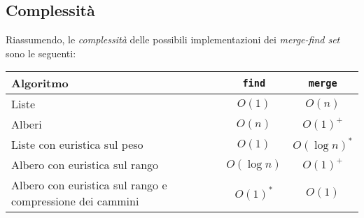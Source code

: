 \subsection{Complessità}
Riassumendo, le \emph{complessità} delle possibili implementazioni dei
\emph{merge-find set} sono le seguenti\footnotemark:

\begin{table}[h!]
    \centering
    \renewcommand{\arraystretch}{1.2}
    \begin{tabular}{|p{}|c|c|}
        \hline
        \textbf{Algoritmo} & \texttt{find} & \texttt{merge}\\
        \hline
        Liste & $O(1)$ & $O(n)$\\
        \hline
        Alberi & $O(n)$ & $O(1)^+$\\
        \hline
        Liste con euristica sul peso & $O(1)$ & $O(\log n)^*$\\
        \hline
        Albero con euristica sul rango & $O(\log n)$ & $O(1)^+$\\
        \hline
        Albero con euristica sul rango e compressione dei cammini & $O(1)^*$ &
        $O(1)$\\
        \hline
    \end{tabular}
\end{table}

